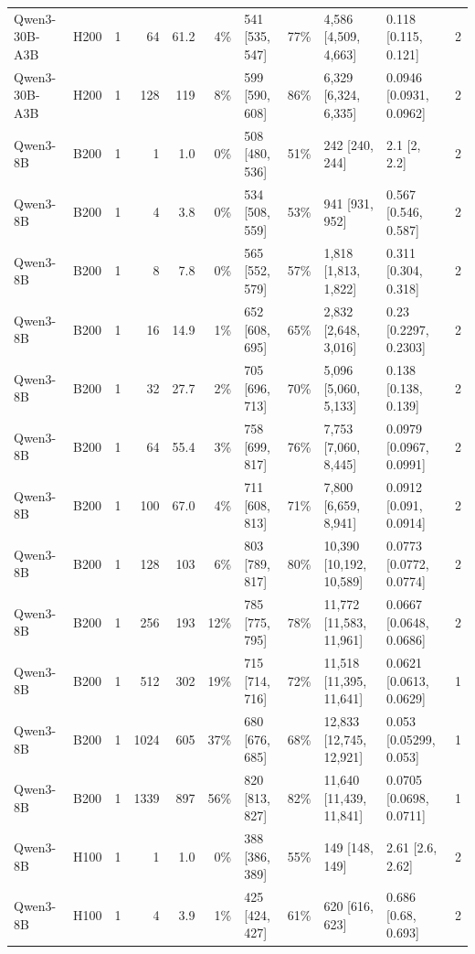 \begin{landscape}
\begin{longtable}{llrrrrlrllr}
Qwen3-30B-A3B & H200 & 1 & 64 & 61.2 & 4\% & 541 {[}535, 547{]} & 77\% & 4,586 {[}4,509, 4,663{]} & 0.118 {[}0.115, 0.121{]} & 2 \\
Qwen3-30B-A3B & H200 & 1 & 128 & 119 & 8\% & 599 {[}590, 608{]} & 86\% & 6,329 {[}6,324, 6,335{]} & 0.0946 {[}0.0931, 0.0962{]} & 2 \\
Qwen3-8B & B200 & 1 & 1 & 1.0 & 0\% & 508 {[}480, 536{]} & 51\% & 242 {[}240, 244{]} & 2.1 {[}2, 2.2{]} & 2 \\
Qwen3-8B & B200 & 1 & 4 & 3.8 & 0\% & 534 {[}508, 559{]} & 53\% & 941 {[}931, 952{]} & 0.567 {[}0.546, 0.587{]} & 2 \\
Qwen3-8B & B200 & 1 & 8 & 7.8 & 0\% & 565 {[}552, 579{]} & 57\% & 1,818 {[}1,813, 1,822{]} & 0.311 {[}0.304, 0.318{]} & 2 \\
Qwen3-8B & B200 & 1 & 16 & 14.9 & 1\% & 652 {[}608, 695{]} & 65\% & 2,832 {[}2,648, 3,016{]} & 0.23 {[}0.2297, 0.2303{]} & 2 \\
Qwen3-8B & B200 & 1 & 32 & 27.7 & 2\% & 705 {[}696, 713{]} & 70\% & 5,096 {[}5,060, 5,133{]} & 0.138 {[}0.138, 0.139{]} & 2 \\
Qwen3-8B & B200 & 1 & 64 & 55.4 & 3\% & 758 {[}699, 817{]} & 76\% & 7,753 {[}7,060, 8,445{]} & 0.0979 {[}0.0967, 0.0991{]} & 2 \\
Qwen3-8B & B200 & 1 & 100 & 67.0 & 4\% & 711 {[}608, 813{]} & 71\% & 7,800 {[}6,659, 8,941{]} & 0.0912 {[}0.091, 0.0914{]} & 2 \\
Qwen3-8B & B200 & 1 & 128 & 103 & 6\% & 803 {[}789, 817{]} & 80\% & 10,390 {[}10,192, 10,589{]} & 0.0773 {[}0.0772, 0.0774{]} & 2 \\
Qwen3-8B & B200 & 1 & 256 & 193 & 12\% & 785 {[}775, 795{]} & 78\% & 11,772 {[}11,583, 11,961{]} & 0.0667 {[}0.0648, 0.0686{]} & 2 \\
Qwen3-8B & B200 & 1 & 512 & 302 & 19\% & 715 {[}714, 716{]} & 72\% & 11,518 {[}11,395, 11,641{]} & 0.0621 {[}0.0613, 0.0629{]} & 1 \\
Qwen3-8B & B200 & 1 & 1024 & 605 & 37\% & 680 {[}676, 685{]} & 68\% & 12,833 {[}12,745, 12,921{]} & 0.053 {[}0.05299, 0.053{]} & 1 \\
Qwen3-8B & B200 & 1 & 1339 & 897 & 56\% & 820 {[}813, 827{]} & 82\% & 11,640 {[}11,439, 11,841{]} & 0.0705 {[}0.0698, 0.0711{]} & 1 \\
Qwen3-8B & H100 & 1 & 1 & 1.0 & 0\% & 388 {[}386, 389{]} & 55\% & 149 {[}148, 149{]} & 2.61 {[}2.6, 2.62{]} & 2 \\
Qwen3-8B & H100 & 1 & 4 & 3.9 & 1\% & 425 {[}424, 427{]} & 61\% & 620 {[}616, 623{]} & 0.686 {[}0.68, 0.693{]} & 2 \\

\end{longtable}
\end{landscape}
